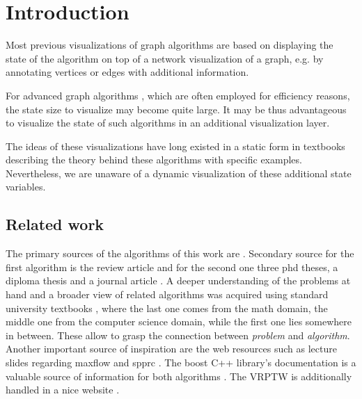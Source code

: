 \chapter{Introduction}\label{ch:1}

Most previous visualizations of graph algorithms \cite{storz2013idp,velden2014idp,sefidgar2015idp,becker2015idp,zoennchen2015idp,fischer2016idp,feil2016idp} are based on displaying the state of the algorithm on top of a network visualization of a graph, e.g. by annotating vertices or edges with additional information.

For advanced graph algorithms \cite{goldberg1988new,irnich2005shortest}, which are often employed for efficiency reasons, the state size to visualize may become quite large. It may be thus advantageous to visualize the state of such algorithms in an additional visualization layer. 

The ideas of these visualizations have long existed in a static form in textbooks describing the theory behind these algorithms with specific examples. Nevertheless, we are unaware of a dynamic visualization of these additional state variables.

\section{Related work}
The primary sources of the algorithms of this work are \cite{goldberg1988new,irnich2005shortest}. Secondary source for the first algorithm is the review article \cite{goldberg2014efficient} and for the second one three phd theses, a diploma thesis and a journal article \cite{solomon1983vehicle,ziegelmann2001constrained,schlechte2003resource,feillet2004exact,garcia2009resource}.
A deeper understanding of the problems at hand and a broader view of related algorithms was acquired using standard university textbooks \cite{ahuja1993network,cormen2009introduction,jungnickel2013graphs}, where the last one comes from the math domain, the middle one from the computer science domain, while the first one lies somewhere in between. These allow to grasp the connection between \textit{problem} and \textit{algorithm}.
Another important source of inspiration are the web resources such as lecture slides regarding maxflow \cite{mayer2013prakt,mehlhorn2000maximum,williamson2007network,matuschke2016network} and spprc \cite{petersen2006label}. The boost C++ library's documentation is a valuable source of information for both algorithms \cite{boost2002push,boost2006rc}. The VRPTW is additionally handled in a nice website \cite{networking2013vehicle}.


